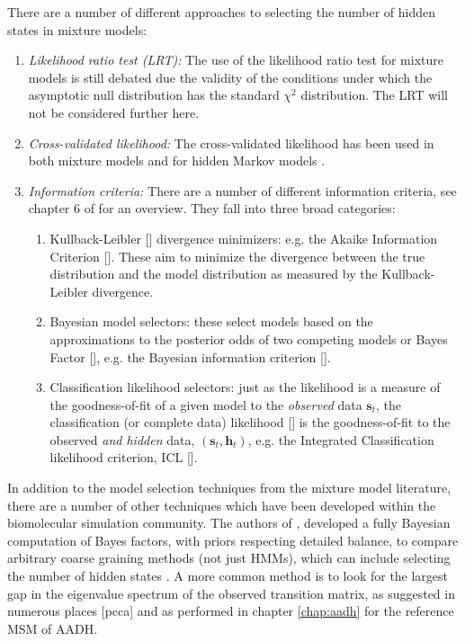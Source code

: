 There are a number of different approaches to selecting the number of hidden states in mixture models: 
\begin{enumerate}
    \item \emph{Likelihood ratio test (LRT):} The use of the likelihood ratio test for mixture models is still debated \cite{mclachlanFiniteMixtureModels2000}\cite{celeuxSelectingHiddenMarkov2008}\cite{cappe2006inference}  due the validity of the conditions under which the asymptotic null distribution has the standard $\chi^{2}$ distribution. The LRT will not be considered further here. 
    \item \emph{Cross-validated likelihood:} The cross-validated likelihood has been used in both mixture models \cite{smythModelSelectionProbabilistic2000} and for hidden Markov models \cite{celeuxSelectingHiddenMarkov2008}. 
    \item \emph{Information criteria:} There are a number of different information criteria, see chapter 6 of \cite{mclachlanFiniteMixtureModels2000} for an overview. They fall into three broad categories:
    \begin{enumerate}
        \item Kullback-Leibler [] divergence minimizers: e.g. the Akaike Information Criterion []. These aim to minimize the divergence between the true distribution and the model distribution as measured by the Kullback-Leibler divergence. 
        \item Bayesian model selectors: these select models based on the approximations to the posterior odds of two competing models or Bayes Factor [], e.g. the Bayesian information criterion [].  
        \item Classification likelihood selectors: just as the likelihood is a measure of the goodness-of-fit of a given model to the \emph{observed} data $\mathbf{s}_t$, the classification (or complete data) likelihood [] is the goodness-of-fit to the observed \emph{and hidden} data, $(\mathbf{s}_t, \mathbf{h}_t)$, e.g. the Integrated Classification likelihood criterion, ICL [].
    \end{enumerate}
\end{enumerate}
 
 In addition to the model selection techniques from the mixture model literature, there are a number of other techniques which have been developed within the biomolecular simulation community. The authors of \cite{bacalladoBayesianComparisonMarkov2009a}, developed a fully Bayesian computation of Bayes factors, with priors respecting detailed balance, to compare arbitrary coarse graining methods (not just HMMs), which can include selecting the number of hidden states \cite{bowmanQuantitativeComparisonAlternative2013}. A more common method is to look for the largest gap in the eigenvalue spectrum of the observed transition matrix, as suggested in numerous places [pcca]\cite{mcgibbonVariationalCrossvalidationSlow2015}\cite{prinzMarkovModelsMolecular2011} and as performed in chapter \ref{chap:aadh} for the reference MSM of AADH. 
 
